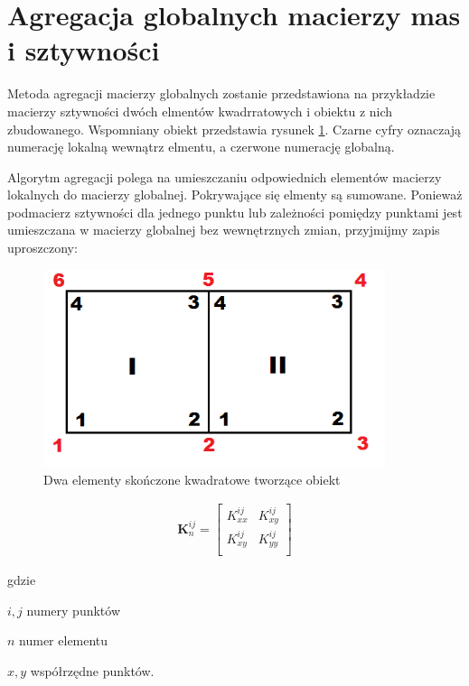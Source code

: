 
\section{Agregacja globalnych macierzy mas i sztywności}
\label{sec:agregacja}

Metoda agregacji macierzy globalnych zostanie przedstawiona na przykładzie macierzy sztywności dwóch elmentów kwadrratowych i obiektu z nich zbudowanego. Wspomniany obiekt przedstawia rysunek \ref{fig:agreg}. Czarne cyfry oznaczają numerację lokalną wewnątrz elmentu, a czerwone numerację globalną.

Algorytm agregacji polega na umieszczaniu odpowiednich elementów macierzy lokalnych do macierzy globalnej. Pokrywające się elmenty są sumowane. Ponieważ podmacierz sztywności dla jednego punktu lub zależności pomiędzy punktami jest umieszczana w macierzy globalnej bez wewnętrznych zmian, przyjmijmy zapis uproszczony:

\begin{figure}[h]
\centering
\includegraphics[width=10cm]{Zdjecia/3/agregacja}
\caption{Dwa elementy skończone kwadratowe tworzące obiekt}
\label{fig:agreg}
\end{figure}

\begin{gather}
	\textbf{K}_n^{ij} = \begin{bmatrix} 
	 	K^{ij}_{xx} & K^{ij}_{xy} \\
	 	K^{ij}_{xy} & K^{ij}_{yy} \\
	\end{bmatrix}
\end{gather}

gdzie
\begin{eqwhere}[2cm]
	\item[$i, j$] numery punktów
	\item[$n$] numer elementu
	\item[$x, y$] współrzędne punktów.
\end{eqwhere}

